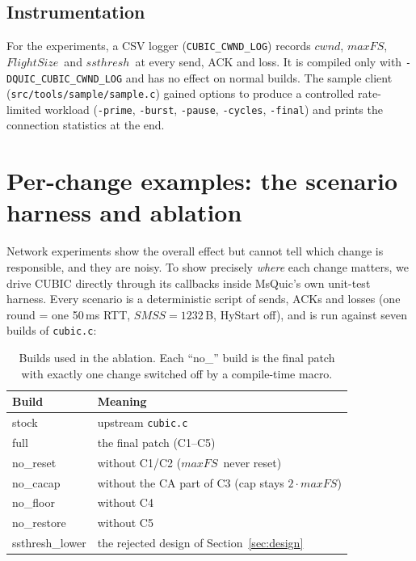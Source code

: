 \documentclass[11pt,a4paper]{article}
\newcommand{\maxfs}{\ensuremath{\mathit{maxFS}}}
\newcommand{\cwnd}{\ensuremath{\mathit{cwnd}}}
\newcommand{\ssthresh}{\ensuremath{\mathit{ssthresh}}}
\newcommand{\smss}{\ensuremath{\mathit{SMSS}}}
\newcommand{\fs}{\ensuremath{\mathit{FlightSize}}}
\begin{document}
\subsection{Instrumentation}
\label{sec:instr}

For the experiments, a CSV logger (\texttt{CUBIC\_CWND\_LOG}) records
\cwnd, \maxfs, \fs\ and \ssthresh\ at every send, ACK and loss. It is
compiled only with \texttt{-DQUIC\_CUBIC\_CWND\_LOG} and has no effect on
normal builds. The sample client (\texttt{src/tools/sample/sample.c}) gained
options to produce a controlled rate-limited workload
(\texttt{-prime}, \texttt{-burst}, \texttt{-pause}, \texttt{-cycles},
\texttt{-final}) and prints the connection statistics at the end.

\section{Per-change examples: the scenario harness and ablation}
\label{sec:examples}

Network experiments show the overall effect but cannot tell which change is
responsible, and they are noisy. To show precisely \emph{where} each change
matters, we drive CUBIC directly through its callbacks inside MsQuic's own
unit-test harness. Every scenario is a deterministic script of sends, ACKs
and losses (one round = one 50\,ms RTT, $\smss = 1232$\,B, HyStart off),
and is run against seven builds of \texttt{cubic.c}:

\begin{table}[ht]
\centering
\caption{Builds used in the ablation. Each ``no\_'' build is the final patch
  with exactly one change switched off by a compile-time macro.}
\label{tab:variants}
\begin{tabular}{@{}ll@{}}
\toprule
Build & Meaning \\
\midrule
\textcolor{stock}{stock} & upstream \texttt{cubic.c} \\
\textcolor{patched}{full} & the final patch (C1--C5) \\
no\_reset & without C1/C2 (\maxfs\ never reset) \\
no\_cacap & without the CA part of C3 (cap stays $2\cdot\maxfs$) \\
no\_floor & without C4 \\
no\_restore & without C5 \\
ssthresh\_lower & the rejected design of Section~\ref{sec:design} \\
\bottomrule
\end{tabular}
\end{table}
\end{document}
